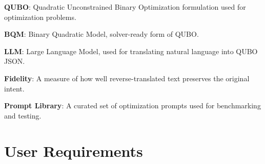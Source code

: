 \textbf{\gls{QUBO}}: Quadratic Unconstrained Binary Optimization formulation used for optimization problems.  

\textbf{\gls{BQM}}: Binary Quadratic Model, solver-ready form of QUBO.  

\textbf{\gls{LLM}}: Large Language Model, used for translating natural language into QUBO JSON.  

\textbf{\gls{Fidelity}}: A measure of how well reverse-translated text preserves the original intent.  

\textbf{\gls{Prompt Library}}: A curated set of optimization prompts used for benchmarking and testing.  
 

\section{User Requirements}

